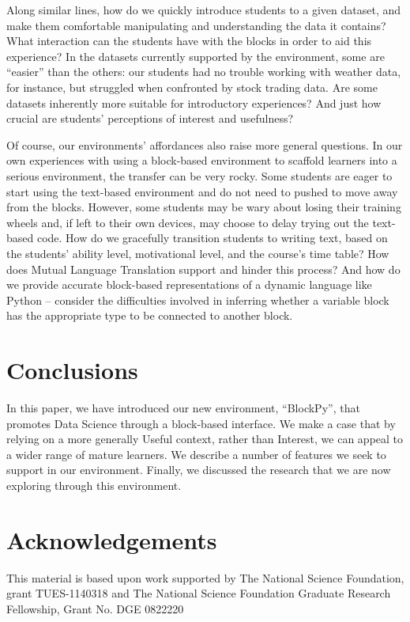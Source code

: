 \documentclass[conference]{IEEEtran}
\begin{document}
Along similar lines, how do we quickly introduce students to a given dataset, and make them comfortable manipulating and understanding the data it contains?
What interaction can the students have with the blocks in order to aid this experience?
In the datasets currently supported by the environment, some are ``easier'' than the others: our students had no trouble working with weather data, for instance, but struggled when confronted by stock trading data.
Are some datasets inherently more suitable for introductory experiences?
And just how crucial are students' perceptions of interest and usefulness? 

Of course, our environments' affordances also raise more general questions.
In our own experiences with using a block-based environment to scaffold learners into a serious environment, the transfer can be very rocky.
Some students are eager to start using the text-based environment and do not need to pushed to move away from the blocks.
However, some students may be wary about losing their training wheels and, if left to their own devices, may choose to delay trying out the text-based code.
How do we gracefully transition students to writing text, based on the students' ability level, motivational level, and the course's time table?
How does Mutual Language Translation support and hinder this process?
And how do we provide accurate block-based representations of a dynamic language like Python -- consider the difficulties involved in inferring whether a variable block has the appropriate type to be connected to another block.

\section{Conclusions}

In this paper, we have introduced our new environment, ``BlockPy'', that promotes Data Science through a block-based interface.
We make a case that by relying on a more generally Useful context, rather than Interest, we can appeal to a wider range of mature learners.
We describe a number of features we seek to support in our environment.
Finally, we discussed the research that we are now exploring through this environment.

\section{Acknowledgements}
This material is based upon work supported by The National Science Foundation, grant TUES-1140318 and The National Science Foundation Graduate Research Fellowship, Grant No. DGE 0822220
\end{document}
